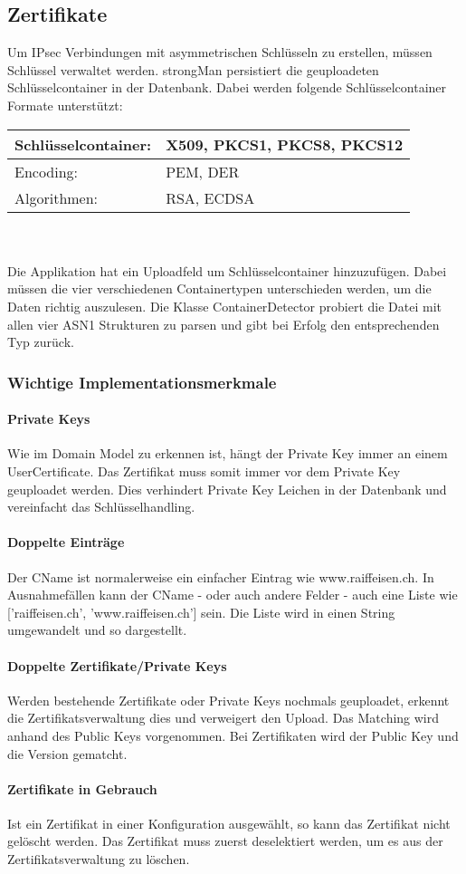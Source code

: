 \subsection{Zertifikate}
Um IPsec Verbindungen mit asymmetrischen Schlüsseln zu erstellen, müssen Schlüssel verwaltet werden. strongMan persistiert die geuploadeten Schlüsselcontainer in der Datenbank.
Dabei werden folgende Schlüsselcontainer Formate unterstützt: \\

\begin{tabular}{ | p{} | p{} | }
\hline
    Schlüsselcontainer: & X509, PKCS1, PKCS8, PKCS12 \\ \hline
    Encoding: & PEM, DER \\ \hline
    Algorithmen: & RSA, ECDSA \\ \hline
\end{tabular}
\\\\
Die Applikation hat ein Uploadfeld um Schlüsselcontainer hinzuzufügen. Dabei müssen die vier verschiedenen Containertypen unterschieden werden, um die Daten richtig auszulesen. Die Klasse ContainerDetector probiert die Datei mit allen vier ASN1 Strukturen zu parsen und gibt bei Erfolg den entsprechenden Typ zurück.

\subsubsection{Wichtige Implementationsmerkmale}
\paragraph{Private Keys} Wie im Domain Model zu erkennen ist, hängt der Private Key immer an einem UserCertificate. Das Zertifikat muss somit immer vor dem Private Key geuploadet werden. Dies verhindert Private Key Leichen in der Datenbank und vereinfacht das Schlüsselhandling.

\paragraph{Doppelte Einträge} Der CName ist normalerweise ein einfacher Eintrag wie www.raiffeisen.ch. In Ausnahmefällen kann der CName - oder auch andere Felder - auch eine Liste wie ['raiffeisen.ch', 'www.raiffeisen.ch'] sein. Die Liste wird in einen String umgewandelt und so dargestellt.

\paragraph{Doppelte Zertifikate/Private Keys}
Werden bestehende Zertifikate oder Private Keys nochmals geuploadet, erkennt die Zertifikatsverwaltung dies und verweigert den Upload. Das Matching wird anhand des Public Keys vorgenommen. Bei Zertifikaten wird der Public Key und die Version gematcht.

\paragraph{Zertifikate in Gebrauch}
Ist ein Zertifikat in einer Konfiguration ausgewählt, so kann das Zertifikat nicht gelöscht werden. Das Zertifikat muss zuerst deselektiert werden, um es aus der Zertifikatsverwaltung zu löschen.





